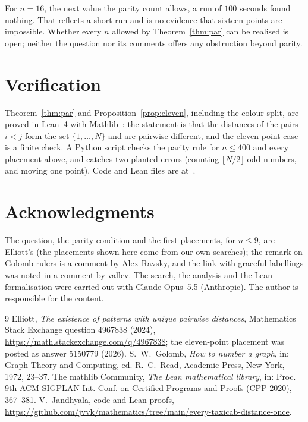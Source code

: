 \documentclass[11pt]{amsart}
\theoremstyle{remark}
\begin{document}
For $n=16$, the next value the parity count allows, a run of $100$ seconds found nothing. That reflects a short run and is no evidence that sixteen points are impossible. Whether every $n$ allowed by Theorem~\ref{thm:par} can be realised is open; neither the question nor its comments offers any obstruction beyond parity.

\section{Verification}

Theorem~\ref{thm:par} and Proposition~\ref{prop:eleven}, including the colour split, are proved in Lean~4 with Mathlib~\cite{mathlib}: the statement is that the distances of the pairs $i<j$ form the set $\{1,\dots,N\}$ and are pairwise different, and the eleven-point case is a finite check. A Python script checks the parity rule for $n\le400$ and every placement above, and catches two planted errors (counting $\lfloor N/2\rfloor$ odd numbers, and moving one point). Code and Lean files are at~\cite{repo}.

\section*{Acknowledgments}

The question, the parity condition and the first placements, for $n\le9$, are Elliott's (the placements shown here come from our own searches); the remark on Golomb rulers is a comment by Alex Ravsky, and the link with graceful labellings was noted in a comment by vallev. The search, the analysis and the Lean formalisation were carried out with Claude Opus~5.5 (Anthropic). The author is responsible for the content.

\begin{thebibliography}{9}
 Elliott, \emph{The existence of patterns with unique pairwise distances}, Mathematics Stack Exchange question 4967838 (2024), \url{https://math.stackexchange.com/q/4967838}; the eleven-point placement was posted as answer 5150779 (2026).
 S.~W.~Golomb, \emph{How to number a graph}, in: Graph Theory and Computing, ed. R.~C.~Read, Academic Press, New York, 1972, 23--37.
 The mathlib Community, \emph{The Lean mathematical library}, in: Proc. 9th ACM SIGPLAN Int. Conf. on Certified Programs and Proofs (CPP 2020), 367--381.
 V.~Jandhyala, code and Lean proofs, \url{https://github.com/jvvk/mathematics/tree/main/every-taxicab-distance-once}.
\end{thebibliography}
\end{document}
